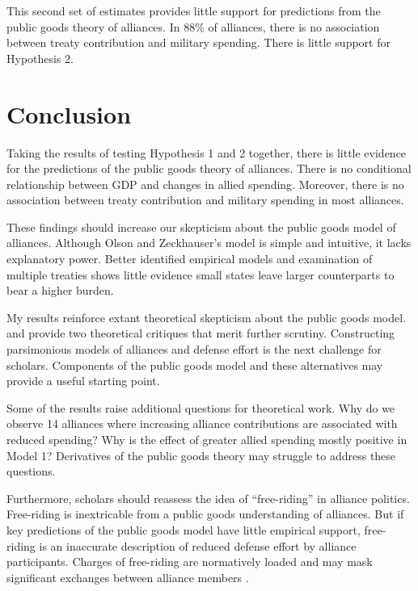 \documentclass[12pt]{article}
\begin{document}
This second set of estimates provides little support for predictions from the public goods theory of alliances. 
In 88\% of alliances, there is no association between treaty contribution and military spending. 
There is little support for Hypothesis 2.


\section{Conclusion}

Taking the results of testing Hypothesis 1 and 2 together, there is little evidence for the predictions of the public goods theory of alliances. 
There is no conditional relationship between GDP and changes in allied spending.
Moreover, there is no association between treaty contribution and military spending in most alliances. 


These findings should increase our skepticism about the public goods model of alliances. 
Although Olson and Zeckhauser's model is simple and intuitive, it lacks explanatory power. 
Better identified empirical models and examination of multiple treaties shows little evidence small states leave larger counterparts to bear a higher burden. 


My results reinforce extant theoretical skepticism about the public goods model. 
\citet{Palmer1990} and \citet{SandlerHartley2001} provide two theoretical critiques that merit further scrutiny. 
Constructing parsimonious models of alliances and defense effort is the next challenge for scholars. 
Components of the public goods model and these alternatives may provide a useful starting point. 


Some of the results raise additional questions for theoretical work. 
Why do we observe 14 alliances where increasing alliance contributions are associated with reduced spending?
Why is the effect of greater allied spending mostly positive in Model 1? 
Derivatives of the public goods theory may struggle to address these questions. 


Furthermore, scholars should reassess the idea of ``free-riding'' in alliance politics. 
Free-riding is inextricable from a public goods understanding of alliances.
But if key predictions of the public goods model have little empirical support, free-riding is an inaccurate description of reduced defense effort by alliance participants.  
Charges of free-riding are normatively loaded and may mask significant exchanges between alliance members \citep{Lanoszka2015}. 
\end{document}
